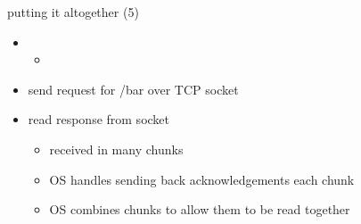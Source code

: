\begin{frame}{putting it altogether (5)}
    \begin{itemize}
    \item {}
        \begin{itemize}
        \item {}
        \end{itemize}
    \vspace{.5cm}
    \item send request for /bar over TCP socket
    \item read response from socket
        \begin{itemize}
        \item received in many chunks
        \item OS handles sending back acknowledgements each chunk
        \item OS combines chunks to allow them to be read together
        \end{itemize}
    \end{itemize}
\end{frame}

